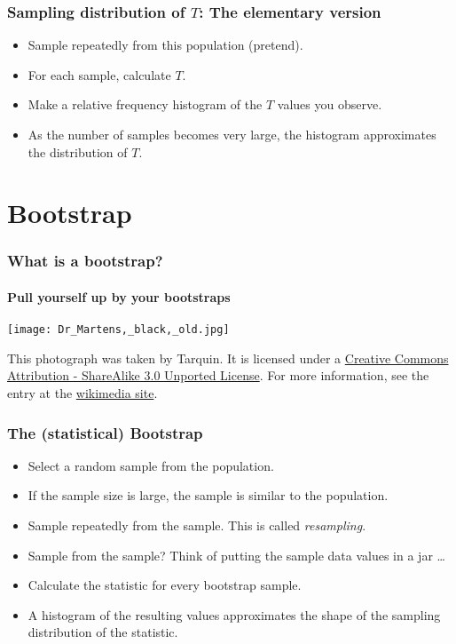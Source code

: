 \documentclass[serif]{beamer} %
\begin{document}
\begin{frame}
\frametitle{Sampling distribution of $T$: The elementary version}
  \begin{itemize}
    \item Sample repeatedly from this population (pretend).
    \item For each sample, calculate $T$.
    \item Make a relative frequency histogram of the $T$ values you observe.
    \item As the number of samples becomes very large, the histogram approximates the distribution of $T$.
  \end{itemize}
\end{frame}

\section{Bootstrap}

\begin{frame}
\frametitle{What is a bootstrap?}
\framesubtitle{Pull yourself up by your bootstraps} 

\begin{center}
\texttt{[image: Dr\_Martens,\_black,\_old.jpg]}
\end{center}

{\scriptsize
This photograph was taken by Tarquin. It is licensed under a 
\href{http://creativecommons.org/licenses/by-sa/3.0/deed.en_US}
     {Creative Commons Attribution - ShareAlike 3.0 Unported License}.
For more information, see the entry at the
\href{http://commons.wikimedia.org/wiki/File:Dr_Martens,_black,_old.jpg}
     {wikimedia site}.
} %
\end{frame}

\begin{frame}
\frametitle{The (statistical) Bootstrap}
  \begin{itemize}
    \item Select a random sample from the population.
    \item If the sample size is large, the sample is similar to the population.
    \item Sample repeatedly from the sample. This is called \emph{resampling}.
    \item Sample from the sample? Think of putting the sample data values in a jar \ldots
    \item Calculate the statistic for every bootstrap sample.
    \item A histogram of the resulting values approximates the shape of the sampling distribution of the statistic.
  \end{itemize}
\end{frame}
\end{document}
